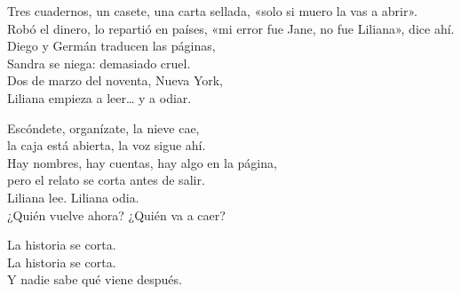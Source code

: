 \begin{lyrics}
Tres cuadernos, un casete, una carta sellada,
«solo si muero la vas a abrir».\\
Robó el dinero, lo repartió en países,
«mi error fue Jane, no fue Liliana», dice ahí.\\
Diego y Germán traducen las páginas,\\
Sandra se niega: demasiado cruel.\\
Dos de marzo del noventa, Nueva York,\\
Liliana empieza a leer… y a odiar.

Escóndete, organízate, la nieve cae,\\
la caja está abierta, la voz sigue ahí.\\
Hay nombres, hay cuentas, hay algo en la página,\\
pero el relato se corta antes de salir.\\
Liliana lee. Liliana odia.\\
¿Quién vuelve ahora? ¿Quién va a caer?

La historia se corta.\\
La historia se corta.\\
Y nadie sabe qué viene después.
\end{lyrics}

